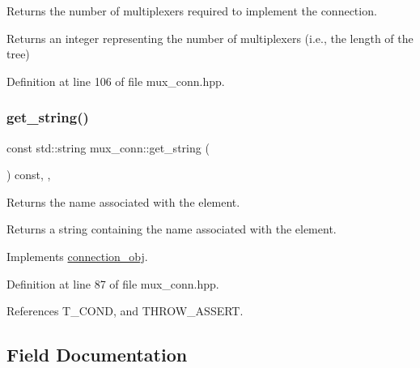 Returns the number of multiplexers required to implement the connection. 

\begin{DoxyReturn}{Returns}
an integer representing the number of multiplexers (i.\+e., the length of the tree) 
\end{DoxyReturn}


Definition at line 106 of file mux\+\_\+conn.\+hpp.

\mbox{\label{classmux__conn_ad3ca34b3bb987ccde2bfbf099473514d}} 
\subsubsection{\texorpdfstring{get\+\_\+string()}{get\_string()}}
{\footnotesize\ttfamily const std\+::string mux\+\_\+conn\+::get\+\_\+string (\begin{DoxyParamCaption}{ }\end{DoxyParamCaption}) const\hspace{0.3cm}{\ttfamily [inline]}, {\ttfamily [override]}, {\ttfamily [virtual]}}



Returns the name associated with the element. 

\begin{DoxyReturn}{Returns}
a string containing the name associated with the element. 
\end{DoxyReturn}


Implements \hyperlink{classconnection__obj_a9d68f6173578ed258c9a6477b2e4b408}{connection\+\_\+obj}.



Definition at line 87 of file mux\+\_\+conn.\+hpp.



References T\+\_\+\+C\+O\+ND, and T\+H\+R\+O\+W\+\_\+\+A\+S\+S\+E\+RT.



\subsection{Field Documentation}
\mbox{\label{classmux__conn_a189ffae3ce4b9d956f04912c66e07067}} 
